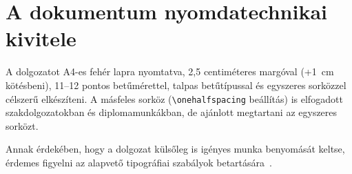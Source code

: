 \section{A dokumentum nyomdatechnikai kivitele}
A dolgozatot A4-es fehér lapra nyomtatva, 2,5 centiméteres margóval (+1~cm kötésbeni), 11--12 pontos betűmérettel, talpas betűtípussal és egyszeres sorközzel célszerű elkészíteni.
A másfeles sorköz (\verb+\onehalfspacing+ beállítás) is elfogadott szakdolgozatokban és diplomamunkákban, de ajánlott megtartani az egyszeres sorközt.

Annak érdekében, hogy a dolgozat külsőleg is igényes munka benyomását keltse, érdemes figyelni az alapvető tipográfiai szabályok betartására~\cite{Jeney}.
